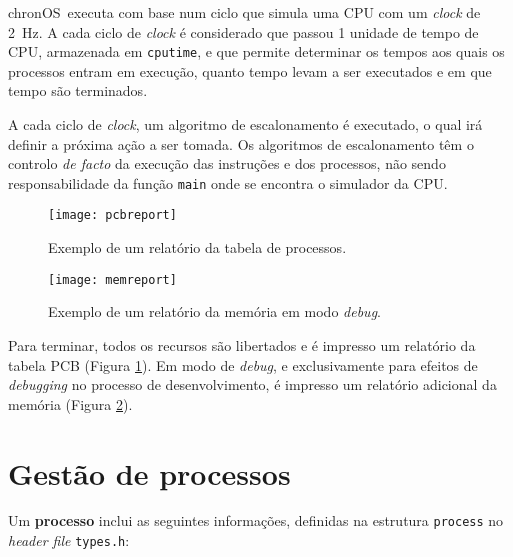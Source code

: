 \documentclass[a4paper,11pt,onecolumn,oneside]{article}
\newcommand{\chronOS}{\textsf{chronOS}}
\begin{document}
	\chronOS~executa com base num ciclo que simula uma CPU com um \textit{clock} de \SI{2}{\hertz}. A cada ciclo de \textit{clock} é considerado que passou 1 unidade de tempo de CPU, armazenada em \verb|cputime|, e que permite determinar os tempos aos quais os processos entram em execução, quanto tempo levam a ser executados e em que tempo são terminados.
	
	A cada ciclo de \textit{clock}, um algoritmo de escalonamento é executado, o qual irá definir a próxima ação a ser tomada. Os algoritmos de escalonamento têm o controlo \textit{de facto} da execução das instruções e dos processos, não sendo responsabilidade da função \verb|main| onde se encontra o simulador da CPU.
	
	\begin{figure}[!btp]
		\centering
		\texttt{[image: pcbreport]}
		\label{fig:pcbreport}
		\caption{Exemplo de um relatório da tabela de processos.}
	\end{figure}
	
	\begin{figure}[!btp]
		\centering
		\texttt{[image: memreport]}
		\label{fig:memreport}
		\caption{Exemplo de um relatório da memória em modo \textit{debug}.}
	\end{figure}

	Para terminar, todos os recursos são libertados e é impresso um relatório da tabela PCB (Figura \ref{fig:pcbreport}). Em modo de \textit{debug}, e exclusivamente para efeitos de \textit{debugging} no processo de desenvolvimento, é impresso um relatório adicional da memória (Figura \ref{fig:memreport}).
	
	
	
	
	\section{Gestão de processos}
	\label{sec:process}
	
	Um \textbf{processo} inclui as seguintes informações, definidas na estrutura \verb|process| no \textit{header file} \texttt{types.h}:
	
\end{document}
